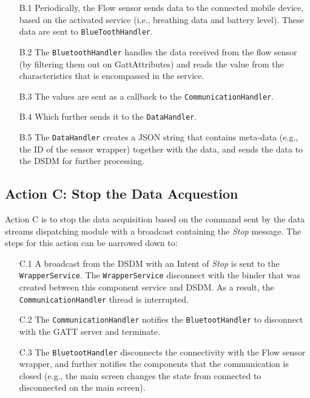 \begin{itemize}
    \item[B.1] Periodically, the Flow sensor sends data to the connected mobile device, based on the activated service (i.e., breathing data and battery level). These data are sent to \verb|BlueToothHandler|. 
    \item[B.2]  The \verb|BluetoothHandler| handles the data received from the flow sensor (by filtering them out on GattAttributes) and reads the value from the characteristics that is encompassed in the service.
    \item[B.3] The values are sent as a callback to the \verb|CommunicationHandler|. 
    \item[B.4] Which further sends it to the \verb|DataHandler|.
    \item[B.5] The \verb|DataHandler| creates a JSON string that contains meta-data (e.g., the ID of the sensor wrapper) together with the data, and sends the data to the DSDM for further processing.    
\end{itemize}


\subsection{Action C: Stop the Data Acquestion}
Action C is to stop the data acquisition based on the command sent by the data streams dispatching module with a broadcast containing the \textit{Stop} message. The steps for this action can be narrowed down to:


\begin{itemize}
    \item[C.1] A broadcast from the DSDM with an Intent of \textit{Stop} is sent to the \verb|WrapperService|. The \verb|WrapperService| disconnect with the binder that was created between this component service and DSDM. As a result, the \verb|CommunicationHandler| thread is interrupted.
    \item[C.2] The \verb|CommunicationHandler| notifies the \verb|BluetootHandler| to disconnect with the GATT server and terminate.
    \item[C.3] The \verb|BluetootHandler| disconnects the connectivity with the Flow sensor wrapper, and further notifies the components that the communication is closed (e.g., the main screen changes the state from connected to disconnected on the main screen). 
\end{itemize}


